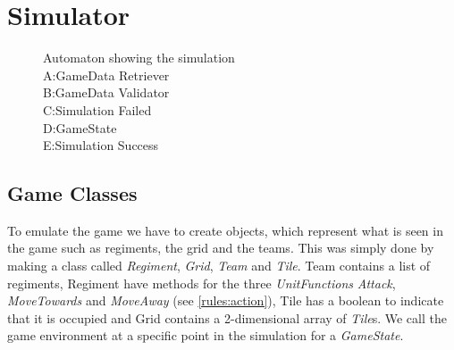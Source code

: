 \section{Simulator}
\begin{figure}
\caption{Automaton showing the simulation \\ 
A:GameData Retriever \\ 
B:GameData Validator \\ 
C:Simulation Failed \\ 
D:GameState \\
E:Simulation Success}
\end{figure}

\subsection{Game Classes}
	To emulate the game we have to create objects, which represent what is seen in the game such as regiments, the grid and the teams.
	This was simply done by making a class called {\it Regiment}, {\it Grid}, {\it Team} and {\it Tile}. 
	Team contains a list of regiments, Regiment have methods for the three {\it UnitFunctions} {\it Attack}, 
	{\it MoveTowards} and {\it MoveAway} (see \ref{rules:action}), Tile has a boolean to indicate that it is occupied 
	and Grid contains a 2-dimensional array of {\it Tile}s. We call the game environment at a specific point in the simulation for a {\it GameState}. 

